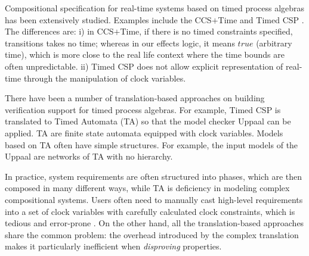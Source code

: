 \documentclass[acmsmall,10pt,review]{acmart}
\newcommand{\code}[1]{{\tt{\ensuremath{\m{#1}}}}}
\newcommand{\m}{\mathit}
\begin{document}
{{{%

Compositional specification for real-time systems based on timed process algebras has been extensively studied. Examples include the CCS\code{\text{+}}Time \cite{DBLP:conf/icalp/Yi91} and Timed CSP \cite{DBLP:journals/tse/DongHQSY08}.  
The differences are: 
i) in CCS\code{\text{+}}Time, if there is no timed constraints specified, transitions takes no time; whereas in our effects logic, it means \code{true} (arbitrary time), which is more close to the real life context where the time bounds are often unpredictable.
ii) Timed CSP does not allow explicit representation of real-time through the manipulation of clock variables.



There have been a number of translation-based approaches on building verification support for timed process algebras. For example, Timed CSP \cite{DBLP:journals/tse/DongHQSY08} is translated to Timed Automata (TA) so that the model checker Uppaal can be \cite{DBLP:journals/sttt/LarsenPY97} applied. 
TA are finite state automata equipped with clock variables. Models based on TA often have simple structures. For example, the input models of the Uppaal are networks of TA with no hierarchy. 


In practice, system requirements are often structured into phases, which are then composed in many different ways, while TA is deficiency in modeling complex compositional systems. Users often need to manually cast high-level requirements into a set of clock variables with carefully calculated clock constraints, which is tedious and error-prone \cite{DBLP:journals/tosem/00010DLSA13}. 
On the other hand, all the translation-based approaches share the common problem: 
the overhead introduced by
the complex translation makes it particularly inefficient when \emph{disproving} properties. 

}}}
\end{document}
